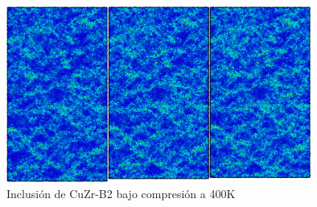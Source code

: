 \documentclass[10pt, oneside]{article} %
\begin{document}
\begin{figure}[H]
\centering
\includegraphics[width=10cm]{Figures/NanoParticles/Snapshots/B2SphereCompression_400K_Snapshots.png}
\caption{Inclusión de CuZr-B2 bajo compresión a 400K}
\end{figure}
\end{document}

